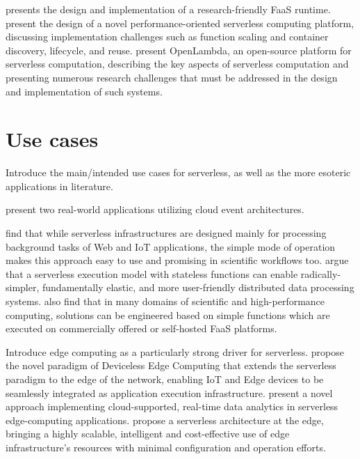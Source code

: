 \documentclass[utf8,english]{gradu3}
\begin{document}
\textcite{spillner17snafu} presents the design and implementation of a research-friendly FaaS runtime. \textcite{mcgrath17implement} present the design of a novel performance-oriented serverless computing platform, discussing implementation challenges such as function scaling and container discovery, lifecycle, and reuse. \textcite{hendrickson16openlambda} present OpenLambda, an open-source platform for serverless computation, describing the key aspects of serverless computation and presenting numerous research challenges that must be addressed in the design and implementation of such systems.

\section{Use cases} \label{sec:useCases}

Introduce the main/intended use cases for serverless, as well as the more esoteric applications in literature.

\textcite{mcgrath16cloudEventParadigms} present two real-world applications utilizing cloud event architectures.

\textcite{malawski17executescientific} find that while serverless infrastructures are designed mainly for processing background tasks of Web and IoT applications, the simple mode of operation makes this approach easy to use and promising in scientific workflows too. \textcite{jonas17occupy} argue that a serverless execution model with stateless functions can enable radically-simpler, fundamentally elastic, and more user-friendly distributed data processing systems. \textcite{spillner18faaster} also find that in many domains of scientific and high-performance computing, solutions can be engineered based on simple functions which are executed on commercially offered or self-hosted FaaS platforms.

Introduce edge computing as a particularly strong driver for serverless. \textcite{glikson17devicelessedge} propose the novel paradigm of Deviceless Edge Computing that extends the serverless paradigm to the edge of the network, enabling IoT and Edge devices to be seamlessly integrated as application execution infrastructure. \textcite{nastic17analyticsedge} present a novel approach implementing cloud-supported, real-time data analytics in serverless edge-computing applications. \textcite{baresi17edgecomputing} propose a serverless architecture at the edge, bringing a highly scalable, intelligent and cost-effective use of edge infrastructure’s resources with minimal configuration and operation efforts.
\end{document}
